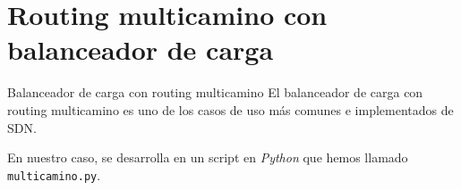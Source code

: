 \documentclass[10pt,spanish,xcolor={svgnames}]{beamer}
\begin{document}
\section{Routing multicamino con balanceador de carga}

\begin{frame}{Balanceador de carga con routing multicamino}
\vspace*{-2em}
El balanceador de carga con routing multicamino es uno de los casos de uso más comunes e implementados de SDN. 
\vspace{0.6em}

En nuestro caso, se desarrolla en un script en \textit{Python} que hemos llamado \texttt{multicamino.py}. %
\vspace*{-2em}
\end{frame}
\end{document}
